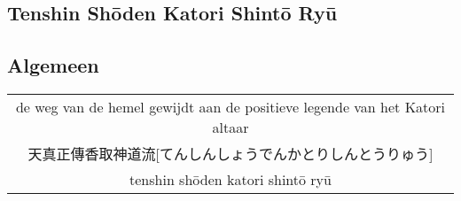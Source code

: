 \documentclass[a4paper,12pt]{article}
\begin{document}
\begin{CJK}{UTF8}{min}
\newpage
\section{Tenshin Sh\={o}den Katori Shint\={o} Ry\={u}}
\subsection{Algemeen}
\begin{table}[H]
\begin{center}
\begin{tabular}{c}
de weg van de hemel gewijdt aan de positieve legende van het Katori altaar\\ 
天真正傳香取神道流[てんしんしょうでんかとりしんとうりゅう]\\
tenshin sh\={o}den katori shint\={o} ry\={u}
\end{tabular}
\end{center}
\label{katori}
\end{table}

\end{CJK}
\end{document}

